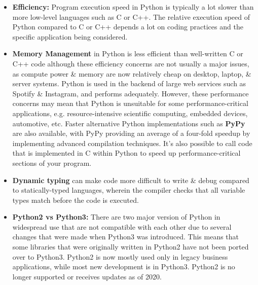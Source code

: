 \documentclass[a4paper,11pt]{article}
\begin{document}
\begin{itemize}
    \item   \textbf{Efficiency:} Program execution speed in Python is typically a lot slower than more low-level
            languages such as C or C++.
            The relative execution speed of Python compared to C or C++ depends a lot on coding practices and the 
            specific application being considered.

    \item   \textbf{Memory Management} in Python is less efficient than well-written C  or C++
            code although these efficiency concerns are not usually a major issues, as compute power \& memory are now 
            relatively cheap on desktop, laptop, \& server systems.
            Python is used in the backend of large web services such as Spotify \& Instagram, and performs 
            adequately.
            However, these performance concerns may mean that Python is unsuitable for some performance-critical 
            applications, e.g. resource-intensive scientific computing, embedded devices, automotive, etc.
            Faster alternative Python implementations such as \textbf{PyPy} are also available, with PyPy
            providing an average of a four-fold speedup by implementing advanced compilation techniques.
            It's also possible to call code that is implemented in C within Python to speed up performance-critical
            sections of your program.

    \item   \textbf{Dynamic typing} can make code more difficult to write \& debug compared to statically-typed 
            languages, wherein the compiler checks that all variable types match before the code is executed.
    
    \item   \textbf{Python2 vs Python3:} There are two major version of Python in widespread use that are not 
            compatible with each other due to several changes that were made when Python3 was introduced.
            This means that some libraries that were originally written in Python2 have not been ported over to 
            Python3.
            Python2 is now mostly used only in legacy business applications, while most new development is in 
            Python3.
            Python2 is no longer supported or receives updates as of 2020.
\end{itemize}
\end{document}
